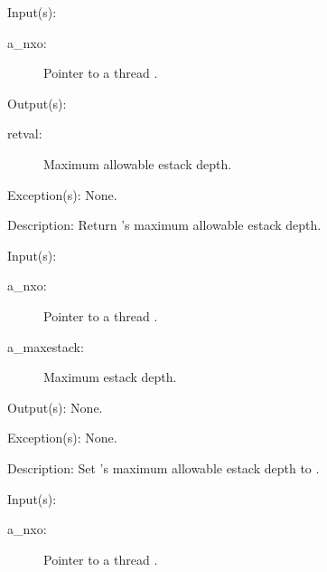 \begin{capi}
\label{nxo_thread_maxestack_get}
	\begin{capilist}
	\item[Input(s): ]
		\begin{description}\item[]
		\item[a\_nxo: ]
			Pointer to a thread .
		\end{description}
	\item[Output(s): ]
		\begin{description}\item[]
		\item[retval: ]
			Maximum allowable estack depth.
		\end{description}
	\item[Exception(s): ] None.
	\item[Description: ]
		Return 's maximum allowable estack depth.
	\end{capilist}
\label{nxo_thread_maxestack_set}
	\begin{capilist}
	\item[Input(s): ]
		\begin{description}\item[]
		\item[a\_nxo: ]
			Pointer to a thread \classname{nxo}.
		\item[a\_maxestack: ]
			Maximum estack depth.
		\end{description}
	\item[Output(s): ] None.
	\item[Exception(s): ] None.
	\item[Description: ]
		Set 's maximum allowable estack depth to
		\cvar{a\_maxestack}.
	\end{capilist}
\label{nxo_thread_nx_get}
	\begin{capilist}
	\item[Input(s): ]
		\begin{description}\item[]
		\item[a\_nxo: ]
			Pointer to a thread .

\end{description}
\end{capilist}
\end{capi}
